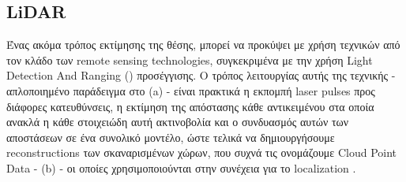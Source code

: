 \subsection{LiDAR} \label{sec:related-lidar}
Ένας ακόμα τρόπος εκτίμησης της θέσης, μπορεί να προκύψει με χρήση τεχνικών από τον κλάδο των  
remote sensing technologies, συγκεκριμένα με την χρήση Light Detection And Ranging () προσέγγισης. Ο τρόπος λειτουργίας αυτής της τεχνικής - απλοποιημένο παράδειγμα στο  (a) - είναι πρακτικά η εκπομπή laser pulses προς διάφορες κατευθύνσεις, η εκτίμηση της απόστασης κάθε αντικειμένου στα οποία ανακλά η κάθε στοιχειώδη αυτή ακτινοβολία και ο συνδυασμός αυτών των αποστάσεων σε ένα συνολικό μοντέλο, ώστε τελικά να δημιουργήσουμε  reconstructions των σκαναρισμένων χώρων, που συχνά τις ονομάζουμε  Cloud Point Data -  (b) -  οι οποίες χρησιμοποιούνται στην συνέχεια για το localization \cite{lidar-basics}.

